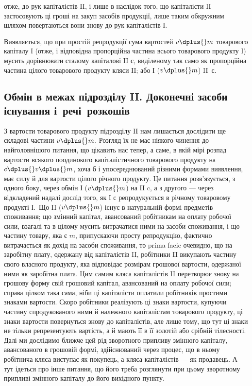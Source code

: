\parcont{}  %
отже, до рук капіталістів II, і лише в наслідок того, що капіталісти II застосовують
ці гроші на закуп засобів продукції, лише таким обкружним
шляхом повертаються вони знову до рук капіталістів І.

Виявляється, що при простій репродукції сума вартостей $v \dplus{} m$ товарового
капіталу І (отже, і відповідна пропорційна частина всього товарового
продукту І) мусить дорівнювати сталому капіталові II $с$, виділеному
так само як пропорційна частина цілого товарового продукту кляси II;
або І ($v \dplus{} m$) \deq{} II~с.

\subsection{Обмін в межах підрозділу II. Доконечні засоби існування
 і~речі~розкошів}

З вартости товарового продукту підрозділу II нам лишається дослідити
ще складові частини $v \dplus{} m$. Розгляд їх не має ніякого чинення до
найголовнішого питання, що цікавить нас тепер, а саме, в якій мірі
розпад вартости всякого поодинокого капіталістичного товарового продукту
на $c \dplus{} v \dplus{} m$, хоча б і упосереднюваний різними формами виявлення,
має силу й для вартости цілого річного продукту. Це питання
розв’язується, з одного боку, через обмін І ($v \dplus{} m$) на II c, а з другого
— через відкладений надалі дослід того, як І $с$ репродукується в
річному товаровому продукті І.~Що II ($v \dplus{} m$) існує в натуральній формі
предметів споживання; що змінний капітал, авансований робітникам на
оплату робочої сили, взагалі та в цілому мусить витрачатися ними на
засоби споживання, і що частину товару, яка є $m$, припускаючи просту
репродукцію, фактично витрачається як дохід на засоби споживання, то
prima facie очевидно, що на заробітну плату, одержану від капіталістів
II, робітники II викупають частину свого власного продукту, яка відповідає
розмірам грошової вартости, одержаної ними як заробітна плата. Цим
самим кляса капіталістів II перетворює знову на грошову форму свій
грошовий капітал, авансований на оплату робочої сили; справа цілком
така сама, ніби ці капіталісти оплатили робітників простими знаками вартости.
Скоро робітники реалізують ці знаки вартости, купуючи частину
спродукованого ними й належного капіталістам товарового продукту, ці
знаки вартости повернуться знову до капіталістів, але лише тому, що тут
ці знаки не тільки репрезентують вартість, а й мають її в її золотій
або срібній тілесності. Далі ми дослідимо ближче цей рід зворотного
припливу змінного капіталу, авансованого в грошовій формі, здійснюваний
через процес, що в ньому робітнича кляса виступає як покупець, а
кляса капіталістів — як продавець. А тут ідеться про інше питання,
що його треба розглянути при цьому зворотному припливі змінного
капіталу до його вихідного пункту.


